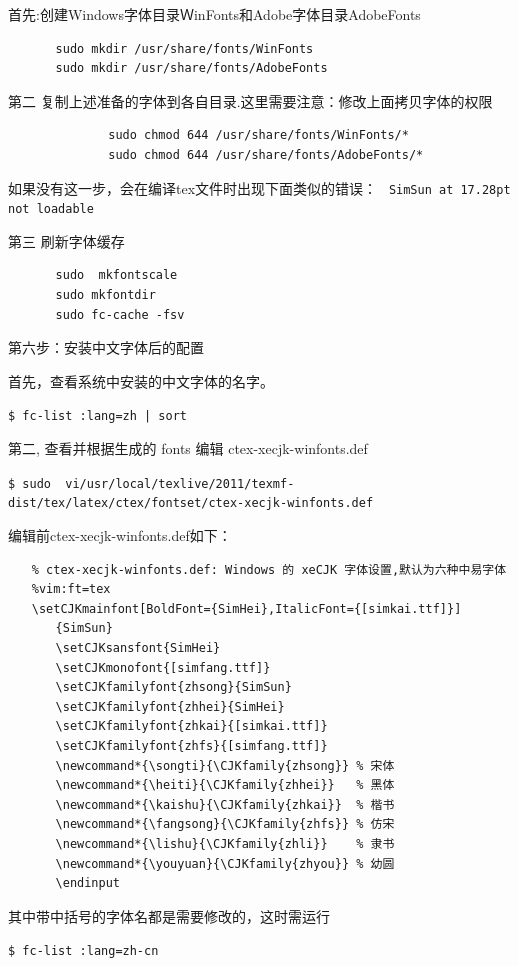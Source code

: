 首先:创建Windows字体目录ＷinFonts和Adobe字体目录AdobeFonts
\begin{verbatim}
　　　　sudo mkdir /usr/share/fonts/WinFonts
　　　　sudo mkdir /usr/share/fonts/AdobeFonts
\end{verbatim}

第二 复制上述准备的字体到各自目录.这里需要注意：修改上面拷贝字体的权限 
\begin{verbatim}
              sudo chmod 644 /usr/share/fonts/WinFonts/*
              sudo chmod 644 /usr/share/fonts/AdobeFonts/*
\end{verbatim}

如果没有这一步，会在编译tex文件时出现下面类似的错误：
\verb" SimSun at 17.28pt not loadable"

第三 刷新字体缓存
\begin{verbatim}
　　　　sudo  mkfontscale
　　　　sudo mkfontdir
　　　　sudo fc-cache -fsv
\end{verbatim}

第六步：安装中文字体后的配置

首先，查看系统中安装的中文字体的名字。

\verb"$ fc-list :lang=zh | sort"

第二, 查看并根据生成的 fonts 编辑 ctex-xecjk-winfonts.def

\verb"$ sudo  vi/usr/local/texlive/2011/texmf-dist/tex/latex/ctex/fontset/ctex-xecjk-winfonts.def"

编辑前ctex-xecjk-winfonts.def如下：
\begin{verbatim}
　　% ctex-xecjk-winfonts.def: Windows 的 xeCJK 字体设置,默认为六种中易字体
　　%vim:ft=tex
　　\setCJKmainfont[BoldFont={SimHei},ItalicFont={[simkai.ttf]}]  
　　　　{SimSun}
　　　　\setCJKsansfont{SimHei}
　　　　\setCJKmonofont{[simfang.ttf]}
　　　　\setCJKfamilyfont{zhsong}{SimSun}
　　　　\setCJKfamilyfont{zhhei}{SimHei}
　　　　\setCJKfamilyfont{zhkai}{[simkai.ttf]}
　　　　\setCJKfamilyfont{zhfs}{[simfang.ttf]}
　　　　\newcommand*{\songti}{\CJKfamily{zhsong}} % 宋体
　　　　\newcommand*{\heiti}{\CJKfamily{zhhei}}   % 黑体
　　　　\newcommand*{\kaishu}{\CJKfamily{zhkai}}  % 楷书
　　　　\newcommand*{\fangsong}{\CJKfamily{zhfs}} % 仿宋
　　　　\newcommand*{\lishu}{\CJKfamily{zhli}}    % 隶书
　　　　\newcommand*{\youyuan}{\CJKfamily{zhyou}} % 幼圆
　　　　\endinput
\end{verbatim}

其中带中括号的字体名都是需要修改的，这时需运行

\verb"$ fc-list :lang=zh-cn"

